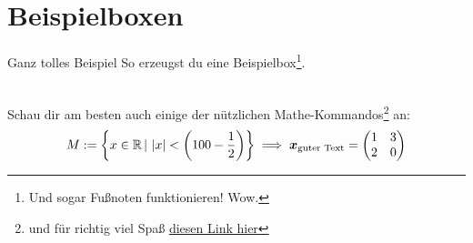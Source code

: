 \section{Beispielboxen}
\begin{Beispiel}{Ganz tolles Beispiel}
So erzeugst du eine Beispielbox\footnote{Und sogar Fußnoten funktionieren! Wow.}.\\
\\
\end{Beispiel}


Schau dir am besten auch einige der nützlichen Mathe-Kommandos\footnote{und für richtig viel Spaß \href{\RickRollLink}{diesen Link hier}} an:
\begin{equation}
    M:=\left\{x\in\mathbb{R}\,|\,\left|{x}\right|<\left({100-\frac{1}{2}}\right)\right\}\implies {{\text{\boldmath${x}$}}}_{\text{guter Text}} = \begin{pmatrix}1&3\\2&0\end{pmatrix}
\end{equation}